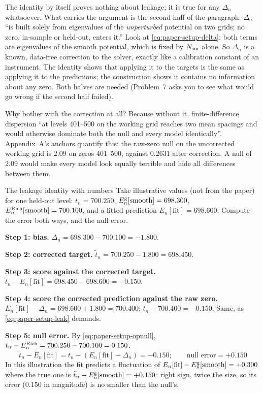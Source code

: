 The identity by itself proves nothing about leakage; it is true for any $\Delta_n$ whatsoever. What carries the argument is the second half of the paragraph: $\Delta_n$ ``is built solely from eigenvalues of the \emph{unperturbed} potential on two grids; no zero, in-sample or held-out, enters it.'' Look at \eqref{eq:paper-setup-delta}: both terms are eigenvalues of the smooth potential, which is fixed by $N_{\mathrm{sm}}$ alone. So $\Delta_n$ is a known, data-free correction to the solver, exactly like a calibration constant of an instrument. The identity shows that applying it to the targets is the same as applying it to the predictions; the construction shows it contains no information about any zero. Both halves are needed (Problem~7 asks you to see what would go wrong if the second half failed).

Why bother with the correction at all? Because without it, finite-difference dispersion ``at levels 401--500 on the working grid reaches two mean spacings and would otherwise dominate both the null and every model identically''. Appendix~A's anchors quantify this: the raw-zero null on the uncorrected working grid is $2.09$ on zeros 401--500, against $0.2631$ after correction. A null of 2.09 would make every model look equally terrible and hide all differences between them.

\begin{sample}{The leakage identity with numbers}
Take illustrative values (not from the paper) for one held-out level: $t_n=700.250$, $E^{\rm g}_n[\text{smooth}]=698.300$, $E^{\rm Rich}_n[\text{smooth}]=700.100$, and a fitted prediction $E_n[\text{fit}]=698.600$. Compute the error both ways, and the null error.

\textbf{Step 1: bias.} $\Delta_n=698.300-700.100=-1.800$.

\textbf{Step 2: corrected target.} $\tilde t_n=700.250-1.800=698.450$.

\textbf{Step 3: score against the corrected target.} $\tilde t_n-E_n[\text{fit}]=698.450-698.600=-0.150$.

\textbf{Step 4: score the corrected prediction against the raw zero.} $E_n[\text{fit}]-\Delta_n=698.600+1.800=700.400$; $t_n-700.400=-0.150$. Same, as \eqref{eq:paper-setup-leak} demands.

\textbf{Step 5: null error.} By \eqref{eq:paper-setup-opnull}, $t_n-E^{\rm Rich}_n=700.250-700.100=0.150$.
\[
\boxed{\tilde t_n-E_n[\text{fit}]=t_n-(E_n[\text{fit}]-\Delta_n)=-0.150;\qquad \text{null error}=+0.150}
\]
In this illustration the fit predicts a fluctuation of $E_n[\text{fit}]-E^{\rm g}_n[\text{smooth}]=+0.300$ where the true one is $\tilde t_n-E^{\rm g}_n[\text{smooth}]=+0.150$: right sign, twice the size, so its error ($0.150$ in magnitude) is no smaller than the null's.
\end{sample}

